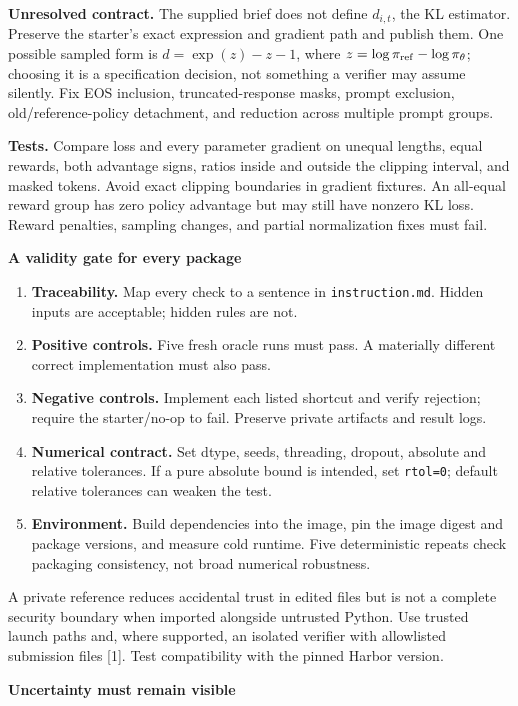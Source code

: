 \documentclass[11pt,a4paper]{article}
\newcommand{\sect}[2]{\vspace{3pt}{\small\color{accent}\textbf{#1}}\par{\LARGE\bfseries #2}\par\vspace{6pt}}
\newcommand{\sub}[1]{\vspace{4pt}\textbf{#1}\par}
\newcommand{\code}[1]{\texttt{#1}}
\begin{document}
\textbf{Unresolved contract.} The supplied brief does not define $d_{i,t}$, the KL estimator. Preserve the starter's exact expression and gradient path and publish them. One possible sampled form is $d=\exp(z)-z-1$, where $z=\log\pi_{\rm ref}-\log\pi_\theta$; choosing it is a specification decision, not something a verifier may assume silently. Fix EOS inclusion, truncated-response masks, prompt exclusion, old/reference-policy detachment, and reduction across multiple prompt groups.

\textbf{Tests.} Compare loss and every parameter gradient on unequal lengths, equal rewards, both advantage signs, ratios inside and outside the clipping interval, and masked tokens. Avoid exact clipping boundaries in gradient fixtures. An all-equal reward group has zero policy advantage but may still have nonzero KL loss. Reward penalties, sampling changes, and partial normalization fixes must fail.

\sub{A validity gate for every package}
\begin{enumerate}
\item \textbf{Traceability.} Map every check to a sentence in \code{instruction.md}. Hidden inputs are acceptable; hidden rules are not.
\item \textbf{Positive controls.} Five fresh oracle runs must pass. A materially different correct implementation must also pass.
\item \textbf{Negative controls.} Implement each listed shortcut and verify rejection; require the starter/no-op to fail. Preserve private artifacts and result logs.
\item \textbf{Numerical contract.} Set dtype, seeds, threading, dropout, absolute and relative tolerances. If a pure absolute bound is intended, set \code{rtol=0}; default relative tolerances can weaken the test.
\item \textbf{Environment.} Build dependencies into the image, pin the image digest and package versions, and measure cold runtime. Five deterministic repeats check packaging consistency, not broad numerical robustness.
\end{enumerate}

A private reference reduces accidental trust in edited files but is not a complete security boundary when imported alongside untrusted Python. Use trusted launch paths and, where supported, an isolated verifier with allowlisted submission files [1]. Test compatibility with the pinned Harbor version.

\newpage
\sect{05 / FORECASTING}{Uncertainty must remain visible}
\end{document}
